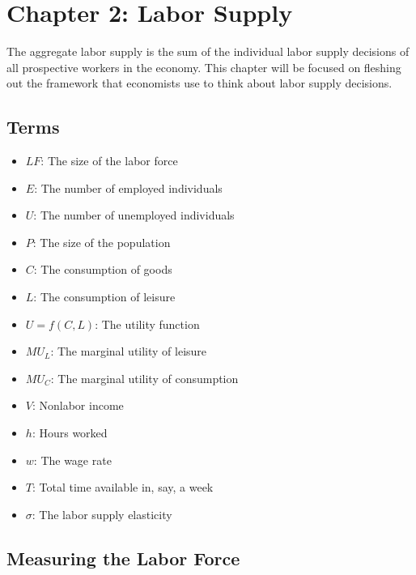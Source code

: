 

\section{Chapter 2: Labor Supply}

The aggregate labor supply 
is the sum of the individual labor supply decisions
of all prospective workers in the economy.
This chapter will be focused on 
fleshing out the framework that economists use 
to think about labor supply decisions.

\subsection{Terms}

\begin{itemize}
    \item $LF$: The size of the labor force
    \item $E$: The number of employed individuals
    \item $U$: The number of unemployed individuals
    \item $P$: The size of the population
    \item $C$: The consumption of goods
    \item $L$: The consumption of leisure
    \item $U=f(C, L)$: The utility function
    \item $MU_L$: The marginal utility of leisure
    \item $MU_C$: The marginal utility of consumption
    \item $V$: Nonlabor income
    \item $h$: Hours worked
    \item $w$: The wage rate
    \item $T$: Total time available in, say, a week
    \item $\sigma$: The labor supply elasticity
\end{itemize}


\subsection{Measuring the Labor Force}

